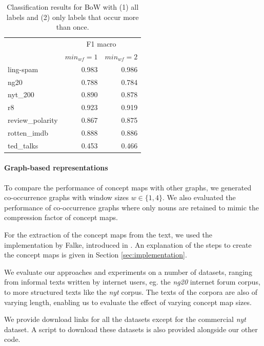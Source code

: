 \begin{table}
\centering
\begin{tabular}{lrr}
\toprule
	{} & \multicolumn{2}{c}{F1 macro} \\
	{} &                         $min_{wf} = 1$ &  $min_{wf} = 2$  \\
	\midrule
	ling-spam       & 0.983 & 0.986 \\
	ng20            & 0.788 & 0.784 \\
	nyt\_200         & 0.890 & 0.878 \\
	r8              & 0.923 & 0.919 \\
	review\_polarity & 0.867 & 0.875 \\
	rotten\_imdb     & 0.888 & 0.886 \\
	ted\_talks       & 0.453 & 0.466 \\
	\bottomrule
\end{tabular}
\caption[Results: BoW minimum word frequency]{Classification results for BoW with (1) all labels and (2) only labels that occur more than once.}
\label{table:results_min_df}
\end{table}

\paragraph{Graph-based representations}
To compare the performance of concept maps with other graphs, we generated co-occurrence graphs with window sizes $w \in \{1, 4\}$.
We also evaluated the performance of co-occurrence graphs where only nouns are retained to mimic the compression factor of concept maps.

For the extraction of the concept maps from the text, we used the implementation by Falke, introduced in \cite{Falke2017}.
An explanation of the steps to create the concept maps is given in Section \ref{sec:implementation}.

We evaluate our approaches and experiments on a number of datasets, ranging from informal texts written by internet users, eg.  the \textit{ng20} internet forum corpus, to more structured texts like the \textit{nyt} corpus.
The texts of the corpora are also of varying length, enabling us to evaluate the effect of varying concept map sizes.

We provide download links for all the datasets except for the commercial \textit{nyt} dataset.
A script to download these datasets is also provided alongside our other code.

